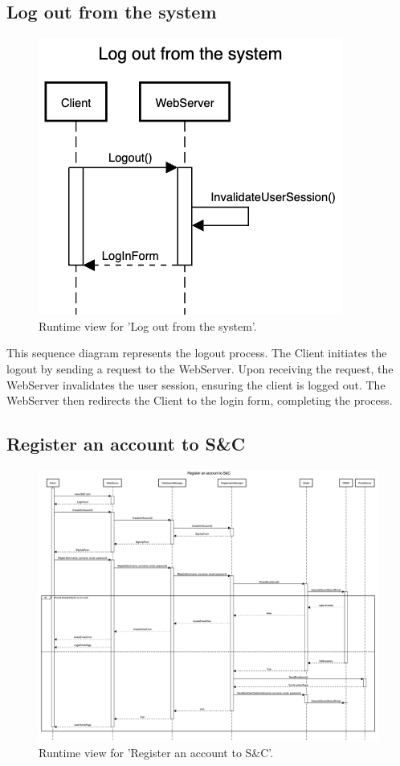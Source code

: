 \subsection{Log out from the system}
\begin{figure}[H]
    \begin{center}
        \includegraphics[width=0.8\linewidth]{DD/LaTeX/Images/RuntimeView/LogOut.png}
        \caption{Runtime view for 'Log out from the system'.}
        \label{fig:runtime_LogOu}%
    \end{center}
\end{figure}

This sequence diagram represents the logout process. The Client initiates the logout by sending a request to the WebServer. Upon receiving the request, the WebServer invalidates the user session, ensuring the client is logged out. The WebServer then redirects the Client to the login form, completing the process.

\subsection{Register an account to S\&C}
\begin{figure}[H]
    \begin{center}
        \includegraphics[width=0.8\linewidth]{DD/LaTeX/Images/RuntimeView/SignUp.png}
        \caption{Runtime view for 'Register an account to S\&C'.}
        \label{fig:runtime_SignUp}%
    \end{center}
\end{figure}

